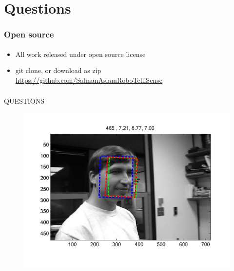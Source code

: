 \section{Questions}
\begin{frame}
\frametitle{Open source}
\framesubtitle{}
\mypagenum
\setcounter{subfigure}{0}
\begin{itemize}
\item All work released under open source license
\item git clone, or download as zip
\small{\color{blue}\underline{\url{https://github.com/SalmanAslamRoboTelliSense}}}
\end{itemize}
\end{frame}

\begin{frame}
\frametitle{}
\mypagenum
		QUESTIONS
\begin{figure}
\includegraphics[width=1.0\textwidth]{thesis/00465.png}
\end{figure}

\end{frame}



